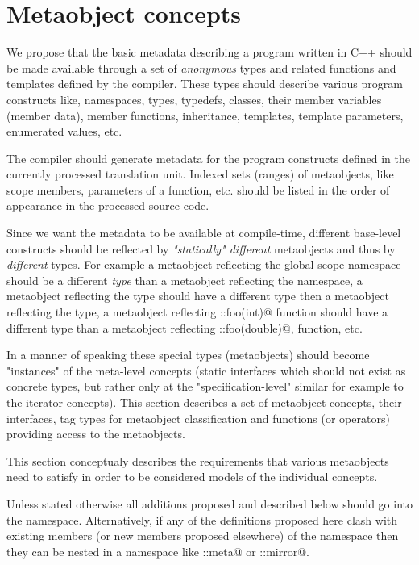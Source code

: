 \section{Metaobject concepts}

We propose that the basic metadata describing a program written
in C++ should be made available through a set of {\em anonymous} types
and related functions and templates
defined by the compiler. These types should describe various program
constructs like, namespaces, types, typedefs, classes, their member variables
(member data), member functions, inheritance, templates, template parameters,
enumerated values, etc.

The compiler should generate metadata for the program constructs defined
in the currently processed translation unit. Indexed sets (ranges) of metaobjects,
like scope members, parameters of a function, etc. should be listed
in the order of appearance in the processed source code.

Since we want the metadata to be available at compile-time,
different base-level constructs should be reflected by
{\em "statically" different} metaobjects and thus by {\em different} types.
For example a metaobject reflecting the global scope namespace should
be a different {\em type} than a metaobject reflecting the \verb@std@
namespace, a metaobject reflecting the \verb@int@ type should
have a different type then a metaobject reflecting the \verb@double@
type, a metaobject reflecting \verb@::foo(int)@ function should
have a different type than a metaobject reflecting \verb@::foo(double)@,
function, etc.

In a manner of speaking these special types (metaobjects) should become
"instances" of the meta-level concepts (static interfaces which
should not exist as concrete types, but rather only at the
"specification-level" similar for example to the iterator concepts).
This section describes a set of metaobject concepts,
their interfaces, tag types for metaobject classification and
functions (or operators) providing access to the metaobjects.

This section conceptualy describes the requirements that various metaobjects
need to satisfy in order to be considered models of the individual
concepts.

Unless stated otherwise all additions proposed and described below should
go into the \verb@std@ namespace. Alternatively, if any of the definitions
proposed here clash with existing members (or new members proposed elsewhere)
of the \verb@std@ namespace then they can be nested in a namespace like
\verb@std::meta@ or \verb@std::mirror@.

